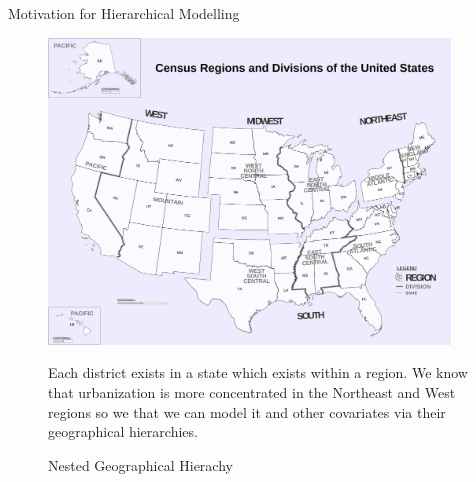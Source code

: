 \documentclass{beamer}
\begin{document}
\begin{frame}{Motivation for Hierarchical Modelling}
    \begin{figure}
    \centering
    \includegraphics[width=0.95\textwidth]{plots/Census_Regions_and_Division_of_the_United_States.svg.png} %
    \caption{Nested Geographical Hierachy}
    Each district exists in a state which exists within a region. We know that urbanization is more concentrated in the Northeast and West regions so we that we can model it and other covariates via their geographical hierarchies.
\end{figure}










\end{frame}
\end{document}
